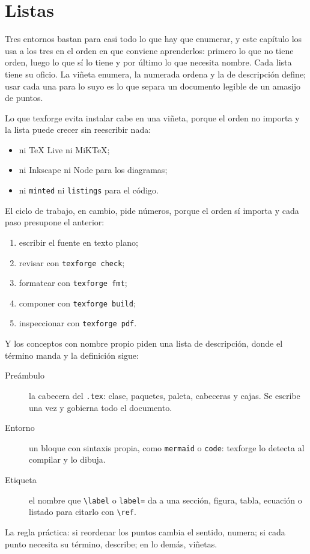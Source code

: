 \section{Listas}\label{sec:listas}

Tres entornos bastan para casi todo lo que hay que enumerar, y este capítulo los
usa a los tres en el orden en que conviene aprenderlos: primero lo que no
tiene orden, luego lo que sí lo tiene y por último lo que necesita nombre.
Cada lista tiene su oficio. La viñeta enumera, la numerada ordena y la de
descripción define; usar cada una para lo suyo es lo que separa un
documento legible de un amasijo de puntos.

Lo que texforge evita instalar cabe en una viñeta, porque el orden no
importa y la lista puede crecer sin reescribir nada:

\begin{itemize}
  \item ni TeX Live ni MiKTeX;
  \item ni Inkscape ni Node para los diagramas;
  \item ni \texttt{minted} ni \texttt{listings} para el código.
\end{itemize}

El ciclo de trabajo, en cambio, pide números, porque el orden sí
importa y cada paso presupone el anterior:

\begin{enumerate}
  \item escribir el fuente en texto plano;
  \item revisar con \texttt{texforge check};
  \item formatear con \texttt{texforge fmt};
  \item componer con \texttt{texforge build};
  \item inspeccionar con \texttt{texforge pdf}.
\end{enumerate}

Y los conceptos con nombre propio piden una lista de descripción, donde el
término manda y la definición sigue:

\begin{description}
  \item[Preámbulo] la cabecera del \texttt{.tex}: clase, paquetes,
  paleta, cabeceras y cajas. Se escribe una vez y gobierna todo el
  documento.
  \item[Entorno] un bloque con sintaxis propia, como \texttt{mermaid} o
  \texttt{code}: texforge lo detecta al compilar y lo dibuja.
  \item[Etiqueta] el nombre que \texttt{\textbackslash label} o
  \texttt{label=} da a una sección, figura, tabla, ecuación o
  listado para citarlo con \texttt{\textbackslash ref}.
\end{description}

\begin{notebox}
  La regla práctica: si reordenar los puntos cambia el sentido, numera;
  si cada punto necesita su término, describe; en lo demás, viñetas.
\end{notebox}
